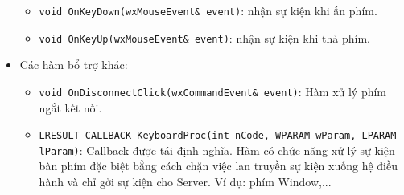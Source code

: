 \begin{itemize}
	\begin{itemize}
		\item[] \lstinline{void OnKeyDown(wxMouseEvent& event)}: nhận sự kiện khi ấn phím.
		\item[] \lstinline{void OnKeyUp(wxMouseEvent& event)}: nhận sự kiện khi thả phím.
	\end{itemize}
	\item Các hàm bổ trợ khác:
		\begin{itemize}
			\item[] \lstinline{void OnDisconnectClick(wxCommandEvent& event)}: Hàm xử lý phím ngắt kết nối.
			\item[] \lstinline{LRESULT CALLBACK KeyboardProc(int nCode, WPARAM wParam, LPARAM lParam)}: Callback được tái định nghĩa. Hàm có chức năng xử lý sự kiện bàn phím đặc biệt bằng cách chặn việc lan truyền sự kiện xuống hệ điều hành và chỉ gởi sự kiện cho Server. Ví dụ: phím Window,...
		\end{itemize}
 \end{itemize}
 
 

